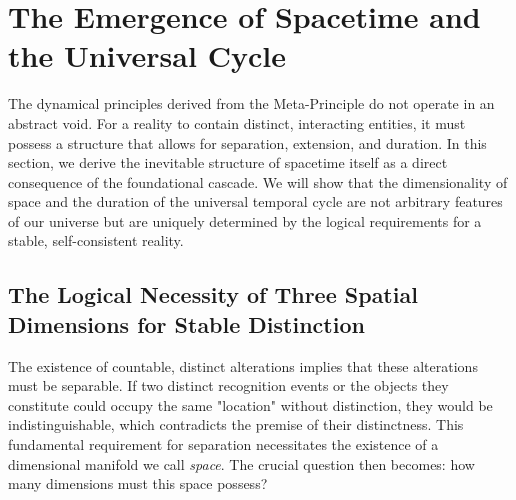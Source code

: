 \documentclass[11pt,a4paper]{article}
\begin{document}
\section{The Emergence of Spacetime and the Universal Cycle}

The dynamical principles derived from the Meta-Principle do not operate in an abstract void. For a reality to contain distinct, interacting entities, it must possess a structure that allows for separation, extension, and duration. In this section, we derive the inevitable structure of spacetime itself as a direct consequence of the foundational cascade. We will show that the dimensionality of space and the duration of the universal temporal cycle are not arbitrary features of our universe but are uniquely determined by the logical requirements for a stable, self-consistent reality.

\subsection{The Logical Necessity of Three Spatial Dimensions for Stable Distinction}
The existence of countable, distinct alterations implies that these alterations must be separable. If two distinct recognition events or the objects they constitute could occupy the same "location" without distinction, they would be indistinguishable, which contradicts the premise of their distinctness. This fundamental requirement for separation necessitates the existence of a dimensional manifold we call \emph{space}. The crucial question then becomes: how many dimensions must this space possess?
\end{document}
